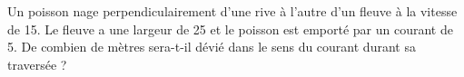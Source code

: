 
\begin{exercice}\label{exosmath-0111}

            Un poisson nage perpendiculairement d'une rive à l'autre d'un fleuve à la vitesse de \unit{15}{\kilo\meter\per\hour}. Le fleuve a une largeur de \unit{25}{\meter} et le poisson est emporté par un courant de \unit{5}{\kilo\meter\per\hour}. De combien de mètres sera-t-il dévié dans le sens du courant durant sa traversée ?

\end{exercice}
